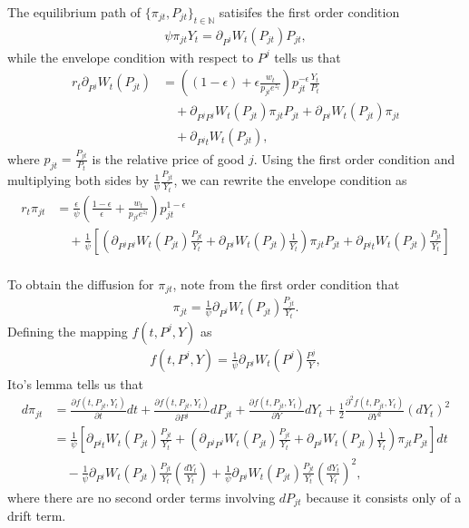 \documentclass[notitlepage,a4paper,11pt]{report}
\numberwithin{section}{chapter}
\numberwithin{subsection}{section}
\begin{document}
The equilibrium path of $\{ \pi_{jt}, P_{jt} \}_{t \in \mathbb{N}}$ satisifes the first order condition 
\begin{align*}
\psi \pi_{jt} Y_t = \partial_{P^j} W_t( P_{jt} ) P_{jt}, 
\end{align*}
while the envelope condition with respect to $P^j$ tells us that 
\begin{align*}
r_t \partial_{P^j} W_t( P_{jt} ) & = \left( (1-\epsilon) + \epsilon \frac{w_t}{ p_{jt} e^{z_t}}\right) p_{jt}^{-\epsilon} \frac{Y_t}{P_t}  \\[10pt]
& \quad + \partial_{P^j P^j} W_t(P_{jt}) \pi_{jt} P_{jt}  + \partial_{P^j} W_t(P_{jt}) \pi_{jt} \\[10pt]
& \quad + \partial_{P^j t } W_t( P_{jt}), 
\end{align*}
where $p_{jt} = \frac{P_{jt}}{P_t}$ is the relative price of good $j$. Using the first order condition and multiplying both sides by $\frac{1}{\psi} \frac{P_{jt}}{Y_t}$,  we can rewrite the envelope condition as 
\begin{align*}
r_t  \pi_{jt} & = \frac{\epsilon}{ \psi} \left( \frac{ 1-\epsilon}{\epsilon}  +  \frac{w_t}{ p_{jt} e^{z_t} } \right) p_{jt}^{1-\epsilon} \\[10pt]
& \quad +\frac{1}{\psi} \left[ \left( \partial_{P^j P^j} W_t(P_{jt}) \frac{P_{jt}}{Y_t} + \partial_{P^j} W_t(P_{jt}) \frac{1}{Y_t} \right) \pi_{jt} P_{jt} + \partial_{P^j t} W_t(P_{jt} ) \frac{P_{jt}}{Y_t} \right] \\
\end{align*}


To obtain the diffusion for $\pi_{jt}$, note from the first order condition that 
\begin{align*}
\pi_{jt} = \frac{1}{\psi} \partial_{P^j} W_t(P_{jt} ) \frac{P_{jt}}{Y_t}. 
\end{align*}
Defining the mapping $f(t, P^j, Y)$ as 
\begin{align*}
f(t, P^j, Y) = \frac{1}{\psi} \partial_{P^j} W_t(P^j ) \frac{P^j}{Y}, 
\end{align*}
Ito's lemma tells us that 
\begin{align*}
d \pi_{jt} & = \frac{\partial f(t,P_{jt}, Y_t)}{\partial t} dt + \frac{\partial f(t,P_{jt}, Y_t) }{\partial P^j} dP_{jt} +   \frac{\partial f(t,P_{jt}, Y_t) }{\partial Y} dY_t + \frac{1}{2} \frac{\partial^2 f(t, P_{jt}, Y_t) }{\partial Y^2} (dY_t)^2 \\[10pt]
& = \frac{1}{\psi} \left[ \partial_{P^j t } W_t( P_{jt}) \frac{P_{jt}}{Y_t}  +  \left( \partial_{P^j P^j} W_t(P_{jt}) \frac{P_{jt}}{Y_t} + \partial_{P^j} W_t(P_{jt}) \frac{1}{Y_t} \right) \pi_{jt} P_{jt} \right] dt  \\[10pt]
& \quad - \frac{1}{\psi} \partial_{P^j} W_t(P_{jt} ) \frac{P_{jt}}{Y_t} \left( \frac{dY_t}{Y_t} \right) + \frac{1}{\psi} \partial_{P^j} W_t(P_{jt}) \frac{P_{jt}}{Y_t} \left( \frac{dY_t}{Y_t} \right)^2, 
\end{align*}
where there are no second order terms involving $dP_{jt}$ because it consists only of a drift term. 
\end{document}
